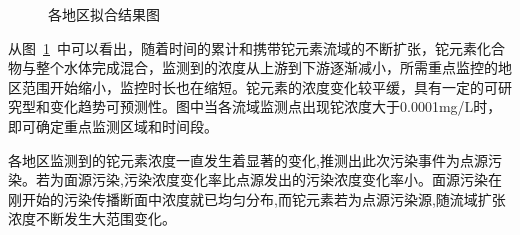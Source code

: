 \documentclass{whutmod}
\begin{document}
\addtocounter{figure}{-1}       %
\begin{figure} [H]
	\addtocounter{figure}{1}      %
	\centering 
		\quad
	\quad
	\quad
	\quad

	\caption{各地区拟合结果图}\label{tu2}
\end{figure}

从图~\ref{tu2}~中可以看出，随着时间的累计和携带铊元素流域的不断扩张，铊元素化合物与整个水体完成混合，监测到的浓度从上游到下游逐渐减小，所需重点监控的地区范围开始缩小，监控时长也在缩短。铊元素的浓度变化较平缓，具有一定的可研究型和变化趋势可预测性。图中当各流域监测点出现铊浓度大于0.0001mg/L时，即可确定重点监测区域和时间段。

各地区监测到的铊元素浓度一直发生着显著的变化,推测出此次污染事件为点源污染。若为面源污染,污染浓度变化率比点源发出的污染浓度变化率小。面源污染在刚开始的污染传播断面中浓度就已均匀分布,而铊元素若为点源污染源,随流域扩张浓度不断发生大范围变化。
\end{document}

